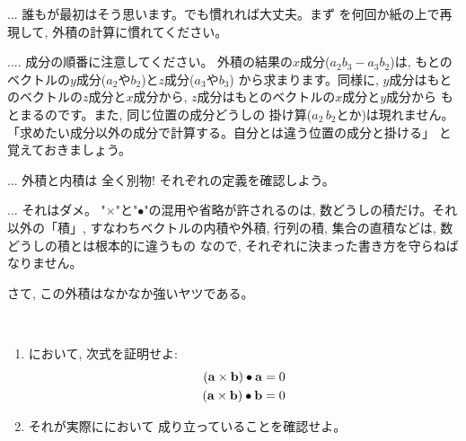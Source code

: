 \begin{faq}{\small{}
... 誰もが最初はそう思います。でも慣れれば大丈夫。まず
を何回か紙の上で再現して, 外積の計算に慣れてください。}\end{faq}\hv

\begin{freqmiss}{\small{} .... 成分の順番に注意してください。
外積の結果の$x$成分($a_2b_3-a_3b_2$)は, もとの
ベクトルの$y$成分($a_2$や$b_2$)と$z$成分($a_3$や$b_3$)
から求まります。同様に, $y$成分はもとのベクトルの$z$成分と$x$成分から, 
$z$成分はもとのベクトルの$x$成分と$y$成分から
もとまるのです。また, 同じ位置の成分どうしの
掛け算($a_2\,b_2$とか)は現れません。
「求めたい成分以外の成分で計算する。自分とは違う位置の成分と掛ける」
と覚えておきましょう。}\end{freqmiss}\hv

\begin{freqmiss}{\small{} ... 外積と内積は
全く別物! それぞれの定義を確認しよう。}\end{freqmiss}\hv

\begin{freqmiss}{\small{} ... それはダメ。
"$\times$"と"$\bullet$"の混用や省略が許されるのは, 
数どうしの積だけ。それ以外の「積」, すなわちベクトルの内積や外積, 
行列の積, 集合の直積などは, 数どうしの積とは根本的に違うもの
なので, それぞれに決まった書き方を守らねばなりません。}\end{freqmiss}\hv


さて, この外積はなかなか強いヤツである。

\begin{q}\label{q:vectprod_inprod}　
\begin{enumerate}
\item {}において, 次式を証明せよ:
\begin{eqnarray}
({\bf a}\times{\bf b})\bullet{\bf a}=0\\
({\bf a}\times{\bf b})\bullet{\bf b}=0
\end{eqnarray}
\item それが実際ににおいて
成り立っていることを確認せよ。
\end{enumerate}
\end{q}

